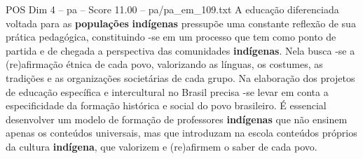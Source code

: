 \begin{textsample}{POS Dim 4 – pa – Score 11.00 – pa/pa\_em\_109.txt}
A educação diferenciada voltada para as \textbf{populações} \textbf{indígenas} pressupõe uma constante reflexão de sua prática pedagógica, constituindo -se em um processo que tem como ponto de partida e de chegada a perspectiva das comunidades \textbf{indígenas}.
Nela busca -se a (re)afirmação étnica de cada povo, valorizando as línguas, os costumes, as tradições e as organizações societárias de cada grupo.
Na elaboração dos projetos de educação específica e intercultural no Brasil precisa -se levar em conta a especificidade da formação histórica e social do povo brasileiro.
É essencial desenvolver um modelo de formação de professores \textbf{indígenas} que não ensinem apenas os conteúdos universais, mas que introduzam na escola conteúdos próprios da cultura \textbf{indígena}, que valorizem e (re)afirmem o saber de cada povo.

\end{textsample}
